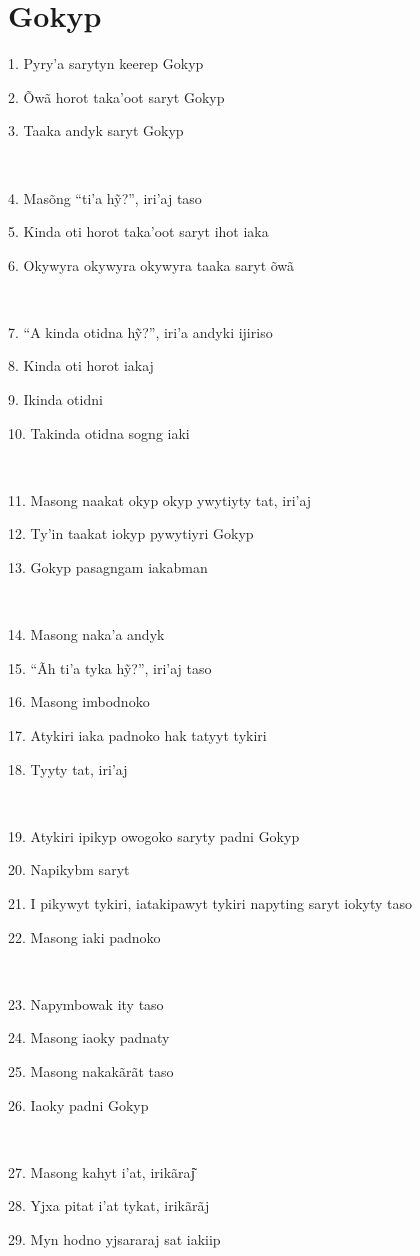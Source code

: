 \chapter*{Gokyp}

1. Pyry'a sarytyn keerep Gokyp

2. Õwã horot taka'oot saryt Gokyp

3. Taaka andyk saryt Gokyp

~

4. Masõng ``ti'a hỹ?'', iri'aj taso

5. Kinda oti horot taka'oot saryt ihot iaka

6. Okywyra okywyra okywyra taaka saryt õwã

~

7. ``A kinda otidna hỹ?'', iri'a andyki ijiriso

8. Kinda oti horot iakaj

9. Ikinda otidni

10. Takinda otidna sogng iaki

~

11. Masong naakat okyp okyp ywytiyty tat, iri'aj

12. Ty'in taakat iokyp pywytiyri Gokyp

13. Gokyp pasagngam iakabman

~

14. Masong naka'a andyk

15. ``Ãh ti'a tyka hỹ?'', iri'aj taso

16. Masong imbodnoko

17. Atykiri iaka padnoko hak tatyyt tykiri

18. Tyyty tat, iri'aj

~

19. Atykiri ipikyp owogoko saryty padni Gokyp

20. Napikybm saryt

21. I pikywyt tykiri, iatakipawyt tykiri napyting saryt iokyty taso

22. Masong iaki padnoko

~

23. Napymbowak ity taso

24. Masong iaoky padnaty

25. Masong nakakãrãt taso

26. Iaoky padni Gokyp

~

27. Masong kahyt i'at, irikãraj͂

28. Yjxa pitat i'at tykat, irikãrãj

29. Myn hodno yjsararaj sat iakiip

